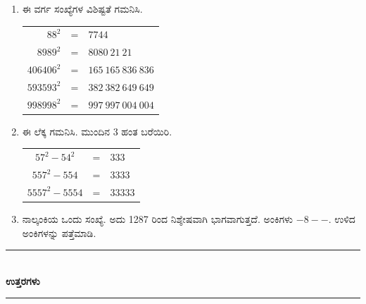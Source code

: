\begin{enumerate}
\item ಈ ವರ್ಗ ಸಂಖ್ಯೆಗಳ ವಿಶಿಷ್ಟತೆ ಗಮನಿಸಿ. 

\begin{tabular}[t]{rcl}
$88^{2}$ & = & $7744$\\
$8989^{2}$ & = & $8080~21~21$\\
$406406^{2}$ & = & $165~165~836~836$\\
$593593^{2}$ & = & $382~382~649~649$\\
$998998^{2}$ & = & $997~997~004~004$
\end{tabular}

\item ಈ ಲೆಕ್ಕ ಗಮನಿಸಿ. ಮುಂದಿನ 3 ಹಂತ ಬರೆಯಿರಿ. 

\begin{tabular}[t]{ccl}
$57^{2} - 54^{2}$ & = & $333$\\
$557^{2} - 554$ & = & $3333$\\
$5557^{2} - 5554$ & = & $33333$
\end{tabular}

\item ನಾಲ್ಕಂಕಿಯ ಒಂದು ಸಂಖ್ಯೆ. ಅದು 1287 ರಿಂದ ನಿಶ್ಶೇಷವಾಗಿ ಭಾಗವಾಗುತ್ತದೆ. ಅಂಕಿಗಳು $- 8 - -$. ಉಳಿದ ಅಂಕಿಗಳನ್ನು ಪತ್ತೆಮಾಡಿ.  
\end{enumerate}


\begin{center}
\rule{5cm}{1pt}\\[3pt]
{\Large\bfseries ಉತ್ತರಗಳು}\\[-0.1cm]
\rule{5cm}{1pt}
\end{center}

